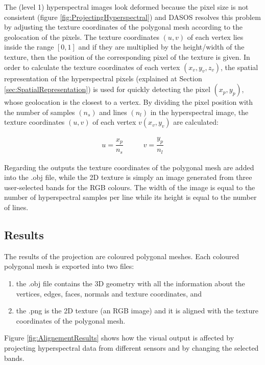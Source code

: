 \documentclass{subfiles}
\begin{document}
	
			
	\par  The (level 1) hyperspectral images look deformed because the pixel size is not consistent (figure \ref{fig:ProjectingHyperspectral}) and DASOS resolves this problem by adjusting the texture coordinates of the polygonal mesh according to the geolocation of the pixels. The texture coordinates $(u, v)$ of each vertex lies inside the range $[0, 1]$ and if they are multiplied by the height/width of the texture, then the position of the corresponding pixel of the texture is given. In order to calculate the texture coordinates of each vertex $(x_v, y_v, z_v)$, the spatial representation of the hyperspectral pixels (explained at Section \ref{sec:SpatialRepresentation}) is used for quickly detecting the pixel $(x_p, y_p )$, whose geolocation is the closest to a vertex. By dividing the pixel position with the number of samples $(n_s)$ and lines $(n_l)$ in the hyperspectral image, the texture coordinates $(u, v)$ of each vertex $v(x_v , y_v)$ are calculated:
		
	\begin{eqnarray}
	u=\dfrac{x_p}{n_s} \;\;\;\;\;\;\;\;\;\; v=\dfrac{y_p}{n_l}
	\end{eqnarray}
	
	\par Regarding the outputs the texture coordinates of the polygonal mesh are added into the .obj file, while the 2D texture is simply an image generated from three user-selected bands for the RGB colours. The width of the image is equal to the number of hyperspectral samples per line while its height is equal to the number of lines.
	
	\subsection {Results}
	

		\par The results of the projection are coloured polygonal meshes. Each coloured polygonal mesh is exported into two files:
		\begin{enumerate}
			\item the .obj file contains the 3D geometry with all the information about the vertices, edges, faces, normals and texture coordinates, and
			\item the .png is the 2D texture (an RGB image) and it is aligned with the texture coordinates of the polygonal mesh.
		\end{enumerate} 
		
		 \par Figure \ref{fig:AlignementResults} shows how the visual output is affected by projecting hyperspectral data from different sensors and by changing the selected bands. 
		
\end{document}
